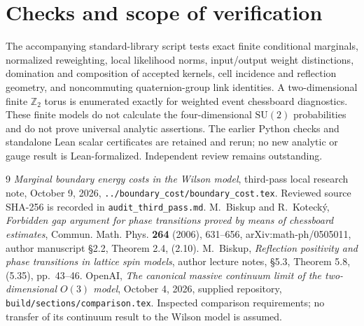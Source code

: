 \documentclass[11pt]{article}
\theoremstyle{definition}
\theoremstyle{remark}
\newcommand{\SU}{\mathrm{SU}(2)}
\begin{document}
\section{Checks and scope of verification}
The accompanying standard-library script tests exact finite conditional
marginals, normalized reweighting, local likelihood norms, input/output
weight distinctions, domination and composition of accepted kernels,
cell incidence and reflection geometry, and noncommuting quaternion-group
link identities. A two-dimensional finite $\mathbb Z_2$ torus is enumerated
exactly for weighted event chessboard diagnostics. These finite models do
not calculate the four-dimensional $\SU$ probabilities and do not prove
universal analytic assertions. The earlier Python checks and standalone
Lean scalar certificates are retained and rerun; no new analytic or gauge
result is Lean-formalized. Independent review remains outstanding.

\begin{thebibliography}{9}
\emph{Marginal boundary energy costs in the Wilson model}, third-pass
local research note, October 9, 2026,
\texttt{../boundary\_cost/boundary\_cost.tex}. Reviewed source SHA-256 is
recorded in \texttt{audit\_third\_pass.md}.
M.~Biskup and R.~Koteck\'y,
\emph{Forbidden gap argument for phase transitions proved by means of
chessboard estimates}, Commun. Math. Phys. \textbf{264} (2006), 631--656,
arXiv:math-ph/0505011, author manuscript \S2.2, Theorem 2.4, (2.10).
M.~Biskup, \emph{Reflection positivity and phase transitions in lattice
spin models}, author lecture notes, \S5.3, Theorem 5.8, (5.35), pp.~43--46.
OpenAI, \emph{The canonical massive continuum limit of the
two-dimensional $O(3)$ model}, October 4, 2026, supplied repository,
\texttt{build/sections/comparison.tex}. Inspected comparison requirements;
no transfer of its continuum result to the Wilson model is assumed.
\end{thebibliography}
\end{document}
